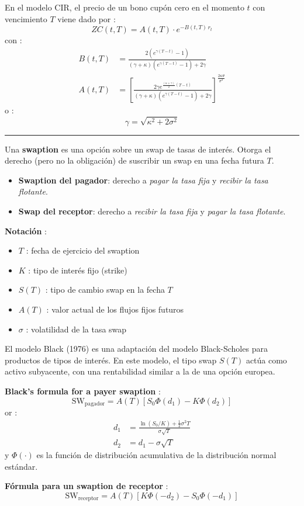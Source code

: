 \begin{f}
En el modelo CIR, el precio de un bono cupón cero en el momento \(t\) con vencimiento \(T\) viene dado por :
\[
ZC(t, T) = A(t, T) \cdot e^{-B(t, T)\, r_t}
\]
con :
\[
\begin{aligned}
	B(t, T) &= \frac{2 (e^{\gamma (T - t)} - 1)}{(\gamma + \kappa)(e^{\gamma (T - t)} - 1) + 2\gamma} \\
	A(t, T) &= \left[ \frac{2\gamma e^{\frac{(\kappa + \gamma)}{2}(T - t)}}{(\gamma + \kappa)(e^{\gamma (T - t)} - 1) + 2\gamma} \right]^{\frac{2\kappa\theta}{\sigma^2}}
\end{aligned}
\]
o :
\[
\gamma = \sqrt{\kappa^2 + 2\sigma^2}
\]

\end{f}
\hrule

\begin{f}

Una \textbf{swaption} es una opción sobre un swap de tasas de interés. Otorga el derecho (pero no la obligación) de suscribir un swap en una fecha futura \(T\).

\begin{itemize}[nosep]
	\item \textbf{Swaption del pagador}: derecho a \emph{pagar la tasa fija} y \emph{recibir la tasa flotante}.
	\item \textbf{Swap del receptor}: derecho a \emph{recibir la tasa fija} y \emph{pagar la tasa flotante}.
\end{itemize}

\textbf{Notación} :
\begin{itemize}[nosep]
	\item \(T\) : fecha de ejercicio del swaption
	\item \(K\) : tipo de interés fijo (strike)
	\item \(S(T)\) : tipo de cambio swap en la fecha \(T\)
	\item \(A(T)\) : valor actual de los flujos fijos futuros
	\item \(\sigma\) : volatilidad de la tasa swap
\end{itemize}

El modelo Black (1976) es una adaptación del modelo Black-Scholes para productos de tipos de interés. En este modelo, el tipo swap \(S(T)\) actúa como activo subyacente, con una rentabilidad similar a la de una opción europea.

\textbf{Black's formula for a payer swaption} :
\[
\text{SW}_{\text{pagador}} = A(T) \left[ S_0\Phi(d_1) - K \Phi(d_2) \right]
\]
or :
\[
\begin{aligned}
	d_1 &= \frac{\ln(S_0 / K) + \frac{1}{2} \sigma^2 T}{\sigma \sqrt{T}} \\
	d_2 &= d_1 - \sigma \sqrt{T}
\end{aligned}
\]
y \(\Phi(\cdot)\) es la función de distribución acumulativa de la distribución normal estándar.

\textbf{Fórmula para un swaption de receptor} :
\[
\text{SW}_{\text{receptor}} = A(T) \left[ K \Phi(-d_2) - S_0 \Phi(-d_1) \right]
\]

\end{f}

